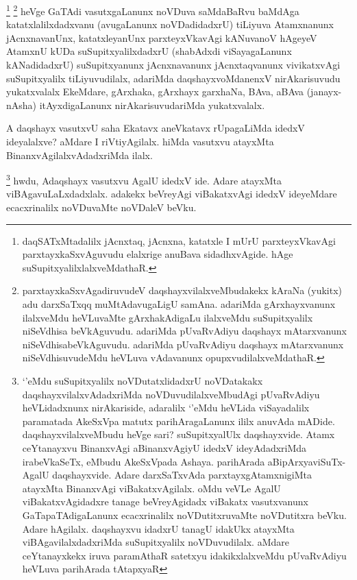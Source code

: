 

\begin{artha}
\footnote{daqSATxMtadalilx jAcnxtaq, jAcnxna, katatxle I mUrU parxteyxVkavAgi parxtayxkaSxvAguvudu elalxrige anuBava sidadhxvAgide. hAge suSupitxyalilxlalxveMdathaR.}
\footnote{parxtayxkaSxvAgadiruvudeV daqshayxvilalxveMbudakekx kAraNa (yukitx) adu darxSaTxqq muMtAdavugaLigU samAna. adariMda gArxhayxvanunx ilalxveMdu heVLuvaMte gArxhakAdigaLu ilalxveMdu suSupitxyalilx niSeVdhisa beVkAguvudu. adariMda pUvaRvAdiyu daqshayx mAtarxvanunx niSeVdhisabeVkAguvudu. adariMda pUvaRvAdiyu daqshayx mAtarxvanunx niSeVdhisuvudeMdu heVLuva vAdavanunx opupxvudilalxveMdathaR.}
heVge GaTAdi vasutxgaLanunx noVDuva saMdaBaRvu baMdAga katatxlalilxdadxvanu (avugaLanunx noVDadidadxrU) tiLiyuva Atamxnanunx jAcnxnavanUnx, katatxleyanUnx parxteyxVkavAgi kANuvanoV hAgeyeV AtamxnU kUDa suSupitxyalilxdadxrU (shabAdxdi viSayagaLanunx kANadidadxrU) suSupitxyanunx jAcnxnavanunx jAcnxtaqvanunx vivikatxvAgi suSupitxyalilx tiLiyuvudilalx, adariMda daqshayxvoMdanenxV nirAkarisuvudu yukatxvalalx EkeMdare, gArxhaka, gArxhayx garxhaNa, BAva, aBAva (janayx-nAsha) itAyxdigaLanunx nirAkarisuvudariMda yukatxvalalx.
\end{artha}


\begin{artha}
A daqshayx vasutxvU saha Ekatavx aneVkatavx rUpagaLiMda idedxV ideyalalxve? aMdare I  riVtiyAgilalx. hiMda vasutxvu atayxMta BinanxvAgilalxvAdadxriMda ilalx.
\end{artha}


\begin{artha}
\footnote{`\stext'eMdu suSupitxyalilx noVDutatxlidadxrU noVDatakakx daqshayxvilalxvAdadxriMda noVDuvudilalxveMbudAgi pUvaRvAdiyu heVLidadxnunx nirAkariside, adaralilx `\stext'eMdu heVLida viSayadalilx paramatada AkeSxVpa matutx parihAragaLanunx ililx anuvAda mADide. daqshayxvilalxveMbudu heVge sari? suSupitxyalUlx daqshayxvide. Atamx ceYtanayxvu BinanxvAgi aBinanxvAgiyU idedxV ideyAdadxriMda irabeVkaSeTx, eMbudu AkeSxVpada Ashaya. parihArada aBipArxyaviSuTx- AgalU daqshayxvide. Adare darxSaTxvAda parxtayxgAtamxnigiMta atayxMta BinanxvAgi viBakatxvAgilalx. oMdu veVLe AgalU viBakatxvAgidadxre tanage beVreyAgidadx viBakatx vasutxvanunx GaTapaTAdigaLanunx ecacxrinalilx noVDutitxruvaMte noVDutitxra beVku. Adare hAgilalx. daqshayxvu idadxrU tanagU idakUkx atayxMta viBAgavilalxdadxriMda suSupitxyalilx noVDuvudilalx. aMdare ceYtanayxkekx iruva paramAthaR satetxyu idakikxlalxveMdu pUvaRvAdiyu heVLuva parihArada tAtapxyaR}
hwdu, Adaqshayx vasutxvu AgalU idedxV ide. Adare atayxMta viBAgavuLaLxdadxlalx. adakekx beVreyAgi viBakatxvAgi idedxV ideyeMdare ecacxrinalilx noVDuvaMte noVDaleV beVku.
\end{artha}

